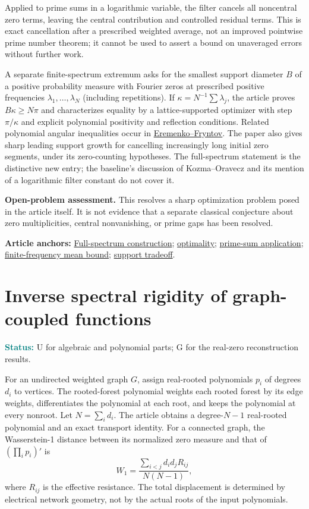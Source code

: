 \documentclass[11pt]{article}
\newcommand{\art}[3]{\href{https://github.com/VladimirReshetnikov/ProveIt/blob/3c4d27a69c98d09319a51e41a19fca05bb80a3e2/Analysis/GeneralizedRiemannHypothesis/Article/sections/#1.tex\#L#2}{#3}}
\newcommand{\status}[1]{\par\smallskip\noindent\textcolor{teal}{\textbf{Status:}} #1\par\smallskip}
\newcommand{\sources}[1]{\par\smallskip\noindent\textbf{Article anchors:} #1\par}
\begin{document}
Applied to prime sums in a logarithmic variable, the filter cancels all noncentral zero terms, leaving the central contribution and controlled residual terms. This is exact cancellation after a prescribed weighted average, not an improved pointwise prime number theorem; it cannot be used to assert a bound on unaveraged errors without further work.

A separate finite-spectrum extremum asks for the smallest support diameter $B$ of a positive probability measure with Fourier zeros at prescribed positive frequencies $\lambda_1,\ldots,\lambda_N$ (including repetitions). If $\kappa=N^{-1}\sum\lambda_j$, the article proves $B\kappa\ge N\pi$ and characterizes equality by a lattice-supported optimizer with step $\pi/\kappa$ and explicit polynomial positivity and reflection conditions. Related polynomial angular inequalities occur in \href{https://arxiv.org/abs/1409.4849}{Eremenko--Fryntov}. The paper also gives sharp leading support growth for cancelling increasingly long initial zero segments, under its zero-counting hypotheses. The full-spectrum statement is the distinctive new entry; the baseline's discussion of Kozma--Oravecz and its mention of a logarithmic filter constant do not cover it.

\textbf{Open-problem assessment.} This resolves a sharp optimization problem posed in the article itself. It is not evidence that a separate classical conjecture about zero multiplicities, central nonvanishing, or prime gaps has been resolved.
\sources{\art{fil}{1717}{Full-spectrum construction}; \art{fil}{1785}{optimality}; \art{fil}{1839}{prime-sum application}; \art{fil}{252}{finite-frequency mean bound}; \art{fil}{1294}{support tradeoff}.}
\clearpage
\section{Inverse spectral rigidity of graph-coupled functions}
\status{U for algebraic and polynomial parts; G for the real-zero reconstruction results.}
For an undirected weighted graph $G$, assign real-rooted polynomials $p_i$ of degrees $d_i$ to vertices. The rooted-forest polynomial weights each rooted forest by its edge weights, differentiates the polynomial at each root, and keeps the polynomial at every nonroot. Let $N=\sum_i d_i$. The article obtains a degree-$N-1$ real-rooted polynomial and an exact transport identity. For a connected graph, the Wasserstein-1 distance between its normalized zero measure and that of $(\prod_i p_i)'$ is
\[
 W_1=\frac{\sum_{i<j}d_i d_j R_{ij}}{N(N-1)},
\]
where $R_{ij}$ is the effective resistance. The total displacement is determined by electrical network geometry, not by the actual roots of the input polynomials.
\end{document}
